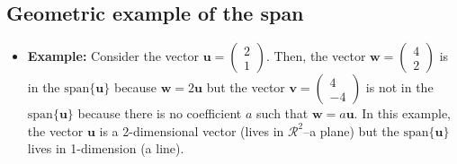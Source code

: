\documentclass[
]{book}
\providecommand{\tightlist}{%
  \setlength{\itemsep}{0pt}\setlength{\parskip}{0pt}}
\theoremstyle{definition}
\theoremstyle{definition}
\theoremstyle{definition}
\theoremstyle{definition}
\theoremstyle{remark}
\begin{document}
\hypertarget{geometric-example-of-the-span}{%
\subsection{Geometric example of the span}\label{geometric-example-of-the-span}}

\begin{itemize}
\tightlist
\item
  \textbf{Example:} Consider the vector \(\mathbf{u} = \begin{pmatrix} 2 \\ 1 \end{pmatrix}\). Then, the vector \(\mathbf{w} = \begin{pmatrix} 4 \\ 2 \end{pmatrix}\) is in the \(\mbox{span}\{\mathbf{u}\}\) because \(\mathbf{w} = 2 \mathbf{u}\) but the vector \(\mathbf{v} = \begin{pmatrix} 4 \\ -4 \end{pmatrix}\) is not in the \(\mbox{span}\{\mathbf{u}\}\) because there is no coefficient \(a\) such that \(\mathbf{w} = a \mathbf{u}\). In this example, the vector \(\mathbf{u}\) is a 2-dimensional vector (lives in \(\mathcal{R}^2\)--a plane) but the \(\mbox{span}\{\mathbf{u}\}\) lives in 1-dimension (a line).
\end{itemize}
\end{document}
